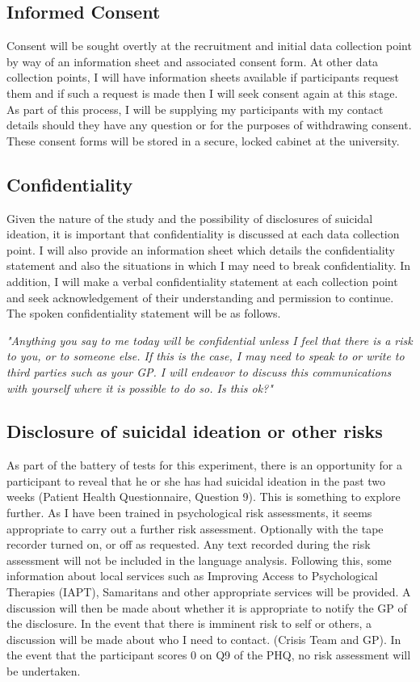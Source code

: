 \documentclass[10pt, letterpaper, twoside, openany]{book}
\begin{document}
\subsection{Informed Consent}
Consent will be sought overtly at the recruitment and initial data collection point by way of an information sheet and associated consent form. At other data collection points, I will have information sheets available if participants request them and if such a request is made then I will seek consent again at this stage. As part of this process, I will be supplying my participants with my contact details should they have any question or for the purposes of withdrawing consent. These consent forms will be stored in a secure, locked cabinet at the university. 
\subsection{Confidentiality}
Given the nature of the study and the possibility of disclosures of suicidal ideation, it is important that confidentiality is discussed at each data collection point. I will also provide an information sheet which details the confidentiality statement and also the situations in which I may need to break confidentiality. In addition, I will make a verbal confidentiality statement at each collection point and seek acknowledgement of their understanding and permission to continue. The spoken confidentiality statement will be as follows.
\begin{center}
	\textit{"Anything you say to me today will be confidential unless I feel that there is a risk to you, or to someone else. If this is the case, I may need to speak to or write to third parties such as your GP. I will endeavor to discuss this communications with yourself where it is possible to do so. Is this ok?"}
\end{center}
\subsection{Disclosure of suicidal ideation or other risks}
As part of the battery of tests for this experiment, there is an opportunity for a participant to reveal that he or she has had suicidal ideation in the past two weeks (Patient Health Questionnaire, Question 9). This is something to explore further. As I have been trained in psychological risk assessments, it seems appropriate to carry out a further risk assessment.  Optionally with the tape recorder turned on, or off as requested.  Any text recorded during the risk assessment will not be included in the language analysis. Following this, some information about local services such as Improving Access to Psychological Therapies (IAPT), Samaritans and other appropriate services will be provided. A discussion will then be made about whether it is appropriate to notify the GP of the disclosure. In the event that there is imminent risk to self or others, a discussion will be made about who I need to contact. (Crisis Team and GP). In the event that the participant scores 0 on Q9 of the PHQ, no risk assessment will be undertaken.
\end{document}
